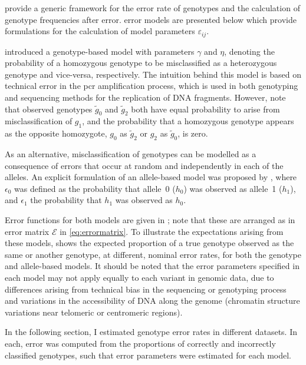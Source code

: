  provide a generic framework for the error rate of genotypes and the calculation of genotype frequencies after error.
 error models are presented below which provide formulations for the calculation of model parameters $\varepsilon_{ij}$.

\citet{Douglas:2002hp} introduced a genotype-based model with parameters $\gamma$ and $\eta$, denoting the probability of a homozygous genotype to be misclassified as a heterozygous genotype and vice-versa, respectively.
The intuition behind this model is based on technical error in the \gls{pcr} amplification process, which is used in both genotyping and sequencing methods for the replication of DNA fragments.
However, note that observed genotypes $\tilde{g}_0$ and $\tilde{g}_2$ both have equal probability to arise from misclassification of $g_1$, and the probability that a homozygous genotype appears as the opposite homozygote, $g_0$ as $\tilde{g}_2$ or $g_2$ as $\tilde{g}_0$, is zero.

As an alternative, misclassification of genotypes can be modelled as a consequence of errors that occur at random and independently in each of the  alleles.
An explicit formulation of an allele-based model was proposed by \citet{Gordon:2001im}, where $\epsilon_0$ was defined as the probability that allele~0 ($h_0$) was observed as allele~1 ($h_1$), and $\epsilon_1$ the probability that $h_1$ was observed as $h_0$.

%

%

%

%

Error functions for both models are given in ; note that these are arranged as in error matrix $\mathcal{E}$ in \cref{eq:errormatrix}.
To illustrate the expectations arising from these models,  shows the expected proportion of a true genotype observed as the same or another genotype, at different, nominal error rates, for both the genotype and allele-based models.
It should be noted that the error parameters specified in each model may not apply equally to each variant in genomic data, due to differences arising from technical bias in the sequencing or genotyping process and variations in the accessibility of DNA along the genome (\eg chromatin structure variations near telomeric or centromeric regions).

In the following section, I estimated genotype error rates in different datasets.
In each, error was computed from the proportions of correctly and incorrectly classified genotypes, such that error parameters were estimated for each model.






